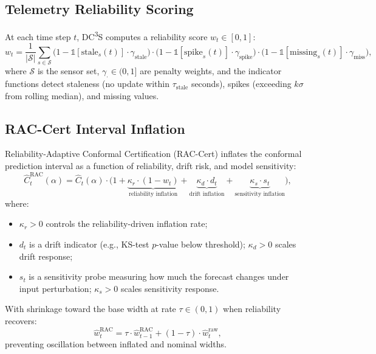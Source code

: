 \documentclass[11pt,a4paper,twocolumn]{article}
\begin{document}
\subsection{Telemetry Reliability Scoring}\label{sec:reliability}

At each time step $t$, DC\textsuperscript{3}S computes a reliability score $w_t \in [0,1]$:
\begin{equation}\label{eq:reliability}
  w_t = \frac{1}{|\mathcal{S}|}\sum_{s \in \mathcal{S}}
    \bigl(1 - \mathbb{1}[\text{stale}_s(t)] \cdot \gamma_{\text{stale}}\bigr)
    \cdot \bigl(1 - \mathbb{1}[\text{spike}_s(t)] \cdot \gamma_{\text{spike}}\bigr)
    \cdot \bigl(1 - \mathbb{1}[\text{missing}_s(t)] \cdot \gamma_{\text{miss}}\bigr),
\end{equation}
where $\mathcal{S}$ is the sensor set, $\gamma_{\cdot} \in (0,1]$ are penalty weights, and the indicator functions detect staleness (no update within $\tau_{\text{stale}}$ seconds), spikes (exceeding $k\sigma$ from rolling median), and missing values.

\subsection{RAC-Cert Interval Inflation}\label{sec:rac}

Reliability-Adaptive Conformal Certification (RAC-Cert) inflates the conformal prediction interval as a function of reliability, drift risk, and model sensitivity:
\begin{equation}\label{eq:rac_inflation}
  \hat{C}_t^{\text{RAC}}(\alpha) = \hat{C}_t(\alpha) \cdot \bigl(1 + \underbrace{\kappa_r \cdot (1 - w_t)}_{\text{reliability inflation}} + \underbrace{\kappa_d \cdot d_t}_{\text{drift inflation}} + \underbrace{\kappa_s \cdot s_t}_{\text{sensitivity inflation}}\bigr),
\end{equation}
where:
\begin{itemize}[leftmargin=*,topsep=2pt,itemsep=1pt]
  \item $\kappa_r > 0$ controls the reliability-driven inflation rate;
  \item $d_t$ is a drift indicator (e.g., KS-test $p$-value below threshold); $\kappa_d > 0$ scales drift response;
  \item $s_t$ is a sensitivity probe measuring how much the forecast changes under input perturbation; $\kappa_s > 0$ scales sensitivity response.
\end{itemize}

With shrinkage toward the base width at rate $\tau \in (0,1)$ when reliability recovers:
\begin{equation}\label{eq:rac_shrinkage}
  \hat{w}_t^{\text{RAC}} = \tau \cdot \hat{w}_{t-1}^{\text{RAC}} + (1 - \tau) \cdot \hat{w}_t^{\text{raw}},
\end{equation}
preventing oscillation between inflated and nominal widths.
\end{document}
